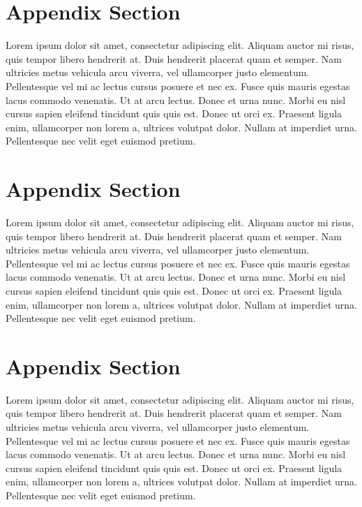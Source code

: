 \documentclass[
	a4paper, %
	12pt, %
]{include/CSSullivanBusinessReport}
\begin{document}
\begin{appendices}

\section{Appendix Section}

Lorem ipsum dolor sit amet, consectetur adipiscing elit. Aliquam auctor mi risus, quis tempor libero hendrerit at. Duis hendrerit placerat quam et semper. Nam ultricies metus vehicula arcu viverra, vel ullamcorper justo elementum. Pellentesque vel mi ac lectus cursus posuere et nec ex. Fusce quis mauris egestas lacus commodo venenatis. Ut at arcu lectus. Donec et urna nunc. Morbi eu nisl cursus sapien eleifend tincidunt quis quis est. Donec ut orci ex. Praesent ligula enim, ullamcorper non lorem a, ultrices volutpat dolor. Nullam at imperdiet urna. Pellentesque nec velit eget euismod pretium.

\section{Appendix Section}

Lorem ipsum dolor sit amet, consectetur adipiscing elit. Aliquam auctor mi risus, quis tempor libero hendrerit at. Duis hendrerit placerat quam et semper. Nam ultricies metus vehicula arcu viverra, vel ullamcorper justo elementum. Pellentesque vel mi ac lectus cursus posuere et nec ex. Fusce quis mauris egestas lacus commodo venenatis. Ut at arcu lectus. Donec et urna nunc. Morbi eu nisl cursus sapien eleifend tincidunt quis quis est. Donec ut orci ex. Praesent ligula enim, ullamcorper non lorem a, ultrices volutpat dolor. Nullam at imperdiet urna. Pellentesque nec velit eget euismod pretium.

\section{Appendix Section}

Lorem ipsum dolor sit amet, consectetur adipiscing elit. Aliquam auctor mi risus, quis tempor libero hendrerit at. Duis hendrerit placerat quam et semper. Nam ultricies metus vehicula arcu viverra, vel ullamcorper justo elementum. Pellentesque vel mi ac lectus cursus posuere et nec ex. Fusce quis mauris egestas lacus commodo venenatis. Ut at arcu lectus. Donec et urna nunc. Morbi eu nisl cursus sapien eleifend tincidunt quis quis est. Donec ut orci ex. Praesent ligula enim, ullamcorper non lorem a, ultrices volutpat dolor. Nullam at imperdiet urna. Pellentesque nec velit eget euismod pretium.

\end{appendices}

\end{document}

